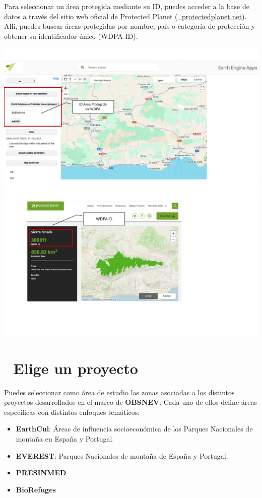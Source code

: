 \documentclass[
]{book}
\providecommand{\tightlist}{%
  \setlength{\itemsep}{0pt}\setlength{\parskip}{0pt}}
\begin{document}
Para seleccionar un área protegida mediante su ID, puedes acceder a la base de datos a través del sitio web oficial de Protected Planet (\href{https://www.protectedplanet.net/}{🔗 protectedplanet.net}). Allí, puedes buscar áreas protegidas por nombre, país o categoría de protección y obtener su identificador único (WDPA ID).

\includegraphics{assets/WDPA_es.png}
\includegraphics{assets/WDPA2.png}

\section{\texorpdfstring{\textbf{📁 Elige un proyecto}}{📁 Elige un proyecto}}\label{elige-un-proyecto}

Puedes seleccionar como área de estudio las zonas asociadas a los distintos proyectos desarrollados en el marco de \textbf{OBSNEV}. Cada uno de ellos define áreas específicas con distintos enfoques temáticos:

\begin{itemize}
\tightlist
\item
  \textbf{EarthCul}: Áreas de influencia socioeconómica de los Parques Nacionales de montaña en España y Portugal.\\
\item
  \textbf{EVEREST}: Parques Nacionales de montaña de España y Portugal.\\
\item
  \textbf{PRESINMED}\\
\item
  \textbf{BioRefuges}
\end{itemize}
\end{document}
